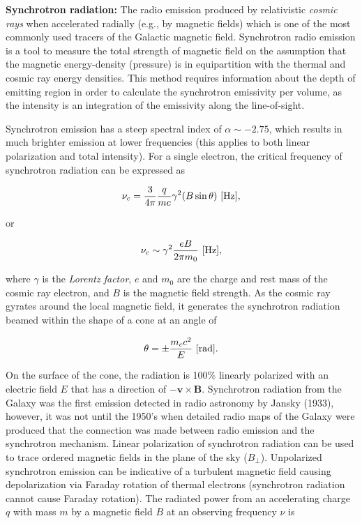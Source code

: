 \documentclass[a4paper,10pt]{article}
\begin{document}
{\noindent}\textbf{Synchrotron radiation:} The radio emission produced by relativistic \textit{cosmic rays} when accelerated radially (e.g., by magnetic fields) which is one of the most commonly used tracers of the Galactic magnetic field. Synchrotron radio emission is a tool to measure the total strength of magnetic field on the assumption that the magnetic energy-density (pressure) is in equipartition with the thermal and cosmic ray energy densities. This method requires information about the depth of emitting region in order to calculate the synchrotron emissivity per volume, as the intensity is an integration of the emissivity along the line-of-sight.

{\noindent}Synchrotron emission has a steep spectral index of $\alpha\sim-2.75$, which results in much brighter emission at lower frequencies (this applies to both linear polarization and total intensity). For a single electron, the critical frequency of synchrotron radiation can be expressed as

\begin{align*}
    \nu_c = \dfrac{3}{4\pi}\dfrac{q}{mc}\gamma^2(B\sin\theta)~[{\rm Hz}],
\end{align*}

{\noindent} or

\begin{align*}
\nu_c \sim \gamma^2 \frac{eB}{2\pi m_0} ~ [{\rm Hz}],
\end{align*}

{\noindent}where $\gamma$ is the \textit{Lorentz factor}, $e$ and $m_0$ are the charge and rest mass of the cosmic ray electron, and $B$ is the magnetic field strength. As the cosmic ray gyrates around the local magnetic field, it generates the synchrotron radiation beamed within the shape of a cone at an angle of 

\begin{align*}
    \theta = \pm \frac{m_cc^2}{E} ~ [{\rm rad}].
\end{align*}

{\noindent}On the surface of the cone, the radiation is 100\% linearly polarized with an electric field $E$ that has a direction of $-\mathbf{v\times B}$. Synchrotron radiation from the Galaxy was the first emission detected in radio astronomy by Jansky (1933), however, it was not until the 1950's when detailed radio maps of the Galaxy were produced that the connection was made between radio emission and the synchrotron mechanism. Linear polarization of synchrotron radiation can be used to trace ordered magnetic fields in the plane of the sky ($B_\perp$). Unpolarized synchrotron emission can be indicative of a turbulent magnetic field causing depolarization via Faraday rotation of thermal electrons (synchrotron radiation cannot cause Faraday rotation). The radiated power from an accelerating charge $q$ with mass $m$ by a magnetic field $B$ at an observing frequency $\nu$ is
\end{document}
